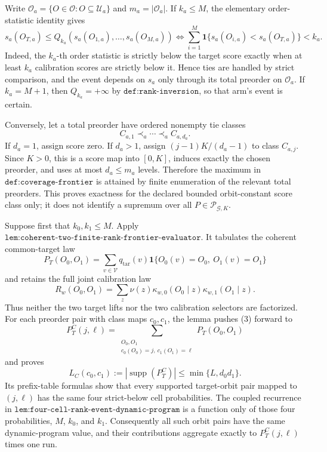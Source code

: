 Write \(\mathcal O_a=\{O\in\mathcal O:O\subseteq\mathcal U_a\}\) and \(m_a=|\mathcal O_a|\). If \(k_a\le M\), the elementary order-statistic identity gives
\[
s_a(O_{T,a})\le Q_{k_a}(s_a(O_{1,a}),\ldots,s_a(O_{M,a}))
\Longleftrightarrow
\sum_{i=1}^M\mathbf 1\{s_a(O_{i,a})<s_a(O_{T,a})\}<k_a.
\tag{1}
\]
Indeed, the \(k_a\)-th order statistic is strictly below the target score exactly when at least \(k_a\) calibration scores are strictly below it. Hence ties are handled by strict comparison, and the event depends on \(s_a\) only through its total preorder on \(\mathcal O_a\). If \(k_a=M+1\), then \(Q_{k_a}=+\infty\) by \(\texttt{def:rank-inversion}\), so that arm's event is certain.

Conversely, let a total preorder have ordered nonempty tie classes
\[
C_{a,1}\prec_a\cdots\prec_a C_{a,d_a}.
\tag{2}
\]
If \(d_a=1\), assign score zero. If \(d_a>1\), assign \((j-1)K/(d_a-1)\) to class \(C_{a,j}\). Since \(K>0\), this is a score map into \([0,K]\), induces exactly the chosen preorder, and uses at most \(d_a\le m_a\) levels. Therefore the maximum in \(\texttt{def:coverage-frontier}\) is attained by finite enumeration of the relevant total preorders. This proves exactness for the declared bounded orbit-constant score class only; it does not identify a supremum over all \(P\in\mathcal P_{\mathcal G,K}\).

Suppose first that \(k_0,k_1\le M\). Apply \(\texttt{lem:coherent-two-finite-rank-frontier-evaluator}\). It tabulates the coherent common-target law
\[
P_T(O_0,O_1)=\sum_{v\in\mathcal V}q_{\mathrm{tar}}(v)
\mathbf 1\{O_0(v)=O_0,\ O_1(v)=O_1\}
\tag{3}
\]
and retains the full joint calibration law
\[
R_w(O_0,O_1)=\sum_z\nu(z)
\kappa_{w,0}(O_0\mid z)\kappa_{w,1}(O_1\mid z).
\tag{4}
\]
Thus neither the two target lifts nor the two calibration selectors are factorized. For each preorder pair with class maps \(c_0,c_1\), the lemma pushes (3) forward to
\[
P_T^C(j,\ell)=
\sum_{\substack{O_0,O_1\\c_0(O_0)=j,\ c_1(O_1)=\ell}}
P_T(O_0,O_1)
\tag{5}
\]
and proves
\[
L_C(c_0,c_1):=|\operatorname{supp}(P_T^C)|
\le\min\{L,d_0d_1\}.
\tag{6}
\]
Its prefix-table formulas show that every supported target-orbit pair mapped to \((j,\ell)\) has the same four strict-below cell probabilities. The coupled recurrence in \(\texttt{lem:four-cell-rank-event-dynamic-program}\) is a function only of those four probabilities, \(M\), \(k_0\), and \(k_1\). Consequently all such orbit pairs have the same dynamic-program value, and their contributions aggregate exactly to \(P_T^C(j,\ell)\) times one run.

